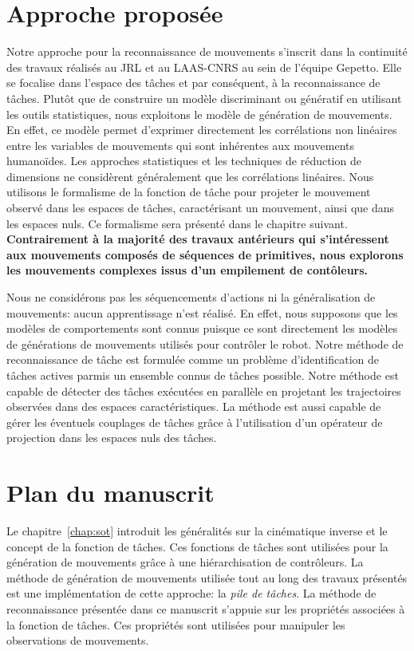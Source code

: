 \section{Approche proposée}
Notre approche pour la reconnaissance de 
mouvements s'inscrit dans la continuité des travaux réalisés au JRL et au LAAS-CNRS au sein
de l'équipe Gepetto.
Elle se focalise dans l'espace des t\^aches et par conséquent,
à la reconnaissance de t\^aches.
Plutôt que de construire un modèle discriminant ou génératif en utilisant 
les outils statistiques, nous exploitons le modèle
de génération de mouvements. En effet, ce modèle permet
d'exprimer directement les corrélations non linéaires entre
les variables de mouvements qui sont inhérentes aux mouvements
humanoïdes. Les approches statistiques et les techniques de
réduction de dimensions ne considèrent généralement que les corrélations linéaires.
Nous utilisons le formalisme de la fonction de t\^ache pour projeter 
le mouvement observé dans les espaces de t\^aches, caractérisant un mouvement, 
ainsi que dans les espaces
nuls. Ce formalisme sera présenté dans le chapitre suivant.
\textbf{Contrairement à la majorité des travaux antérieurs qui s'intéressent
aux mouvements composés de séquences de primitives, nous explorons les 
mouvements complexes issus d'un empilement de contôleurs.}

Nous ne considérons pas les séquencements d'actions ni la généralisation de mouvements:
aucun apprentissage n'est réalisé. En effet, nous supposons que les modèles 
de comportements sont connus puisque ce sont directement les modèles 
de générations de mouvements utilisés pour contrôler le robot.
Notre méthode de reconnaissance de t\^ache est formulée comme un problème d'identification
de t\^aches actives parmis un ensemble connus de t\^aches possible. Notre méthode 
est capable de détecter des t\^aches exécutées en parallèle en projetant
les trajectoires observées dans des espaces caractéristiques.
La méthode est aussi capable de gérer les éventuels couplages de t\^aches gr\^ace
à l'utilisation d'un opérateur de projection dans les espaces nuls des t\^aches.

\section{Plan du manuscrit}
Le chapitre~\ref{chap:sot} introduit les généralités sur la 
cinématique inverse et le concept de la fonction de t\^aches.
Ces fonctions de t\^aches sont utilisées pour la génération de mouvements
gr\^ace à une hiérarchisation de contrôleurs. La méthode
de génération de mouvements utilisée tout au long des travaux présentés
est une implémentation de cette approche: la \emph{pile de t\^aches}.
La méthode de reconnaissance présentée dans ce manuscrit s'appuie sur les propriétés associées à 
la fonction de t\^aches. Ces propriétés sont utilisées pour manipuler
les observations de mouvements.

